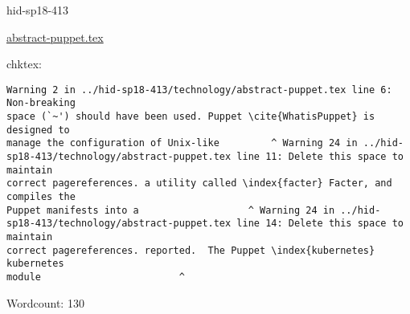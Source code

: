 

\begin{IU}

hid-sp18-413

\href{https://github.com/cloudmesh-community/hid-sp18-413/blob/master//technology/abstract-puppet.tex}{abstract-puppet.tex}

 
chktex:
\begin{tiny}
\begin{verbatim}
Warning 2 in ../hid-sp18-413/technology/abstract-puppet.tex line 6: Non-breaking
space (`~') should have been used. Puppet \cite{WhatisPuppet} is designed to
manage the configuration of Unix-like         ^ Warning 24 in ../hid-
sp18-413/technology/abstract-puppet.tex line 11: Delete this space to maintain
correct pagereferences. a utility called \index{facter} Facter, and compiles the
Puppet manifests into a                   ^ Warning 24 in ../hid-
sp18-413/technology/abstract-puppet.tex line 14: Delete this space to maintain
correct pagereferences. reported.  The Puppet \index{kubernetes} kubernetes
module                        ^
\end{verbatim}
\end{tiny}

Wordcount: 130

\end{IU}



